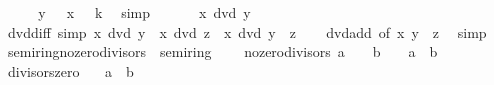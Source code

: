 \begin{isabellebody}
\isanewline
\ \ \isamarkupfalse%
\ \isamarkupfalse%
\ {\isachardoublequoteopen}y\ {\isacharequal}{\kern0pt}\ {\isacharminus}{\kern0pt}\ x\ {\isacharasterisk}{\kern0pt}\ {\isacharminus}{\kern0pt}\ k{\isachardoublequoteclose}\ \isamarkupfalse%
\ simp\isanewline
\ \ \isamarkupfalse%
\ \isamarkupfalse%
\ {\isachardoublequoteopen}{\isacharminus}{\kern0pt}\ x\ dvd\ y{\isachardoublequoteclose}\ \isacommand{{\isachardot}{\kern0pt}{\isachardot}{\kern0pt}}\isamarkupfalse%
\isanewline
{}\isamarkupfalse%
%
\endisatagproof
{\isafoldproof}%
%
\isadelimproof
\isanewline
%
\endisadelimproof
\isanewline
{}\isamarkupfalse%
\ dvd{\isacharunderscore}{\kern0pt}diff\ {\isacharbrackleft}{\kern0pt}simp{\isacharbrackright}{\kern0pt}{\isacharcolon}{\kern0pt}\ {\isachardoublequoteopen}x\ dvd\ y\ {\isasymLongrightarrow}\ x\ dvd\ z\ {\isasymLongrightarrow}\ x\ dvd\ {\isacharparenleft}{\kern0pt}y\ {\isacharminus}{\kern0pt}\ z{\isacharparenright}{\kern0pt}{\isachardoublequoteclose}\isanewline
%
\isadelimproof
\ \ %
\endisadelimproof
%
\isatagproof
{}\isamarkupfalse%
\ dvd{\isacharunderscore}{\kern0pt}add\ {\isacharbrackleft}{\kern0pt}of\ x\ y\ {\isachardoublequoteopen}{\isacharminus}{\kern0pt}\ z{\isachardoublequoteclose}{\isacharbrackright}{\kern0pt}\ \isamarkupfalse%
\ simp%
\endisatagproof
{\isafoldproof}%
%
\isadelimproof
\isanewline
%
\endisadelimproof
\isanewline
{}\isamarkupfalse%
%
\isadelimdocument
%
\endisadelimdocument
%
\isatagdocument
%
\isamarkuptrue%
%
\endisatagdocument
{\isafolddocument}%
%
\isadelimdocument
%
\endisadelimdocument
{}\isamarkupfalse%
\ semiring{\isacharunderscore}{\kern0pt}no{\isacharunderscore}{\kern0pt}zero{\isacharunderscore}{\kern0pt}divisors\ {\isacharequal}{\kern0pt}\ semiring{\isacharunderscore}{\kern0pt}{}\ {\isacharplus}{\kern0pt}\isanewline
\ \ \ no{\isacharunderscore}{\kern0pt}zero{\isacharunderscore}{\kern0pt}divisors{\isacharcolon}{\kern0pt}\ {\isachardoublequoteopen}a\ {\isasymnoteq}\ {}\ {\isasymLongrightarrow}\ b\ {\isasymnoteq}\ {}\ {\isasymLongrightarrow}\ a\ {\isacharasterisk}{\kern0pt}\ b\ {\isasymnoteq}\ {}{\isachardoublequoteclose}\isanewline
{}\isanewline
\isanewline
{}\isamarkupfalse%
\ divisors{\isacharunderscore}{\kern0pt}zero{\isacharcolon}{\kern0pt}\isanewline
\ \ \ {\isachardoublequoteopen}a\ {\isacharasterisk}{\kern0pt}\ b\ {\isacharequal}{\kern0pt}\ {}{\isachardoublequoteclose}\isanewline

\end{isabellebody}
